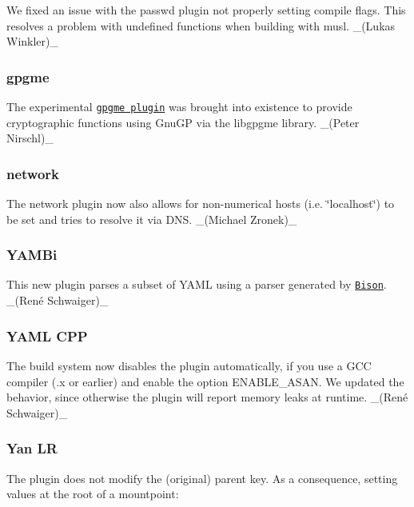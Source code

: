 We fixed an issue with the passwd plugin not properly setting compile flags. This resolves a problem with undefined functions when building with musl. \+\_\+(\+Lukas Winkler)\+\_\+

\subsubsection*{gpgme}

The experimental \href{https://libelektra.org/plugins/gpgme}{\tt gpgme plugin} was brought into existence to provide cryptographic functions using Gnu\+GP via the {\ttfamily libgpgme} library. \+\_\+(\+Peter Nirschl)\+\_\+

\subsubsection*{network}

The {\ttfamily network} plugin now also allows for non-\/numerical hosts (i.\+e. \char`\"{}localhost\char`\"{}) to be set and tries to resolve it via D\+NS. \+\_\+(\+Michael Zronek)\+\_\+

\subsubsection*{Y\+A\+M\+Bi}

This new plugin parses a subset of Y\+A\+ML using a parser generated by \href{https://www.gnu.org/software/bison}{\tt Bison}. \+\_\+(René Schwaiger)\+\_\+

\subsubsection*{Y\+A\+ML C\+PP}

The build system now disables the plugin automatically, if you use a G\+CC compiler ({.\+x} or earlier) and enable the option {\ttfamily E\+N\+A\+B\+L\+E\+\_\+\+A\+S\+AN}. We updated the behavior, since otherwise the plugin will report memory leaks at runtime. \+\_\+(René Schwaiger)\+\_\+

\subsubsection*{Yan LR}


\begin{DoxyItemize}
\item The plugin does not modify the (original) parent key. As a consequence, setting values at the root of a mountpoint\+:
\end{DoxyItemize}



